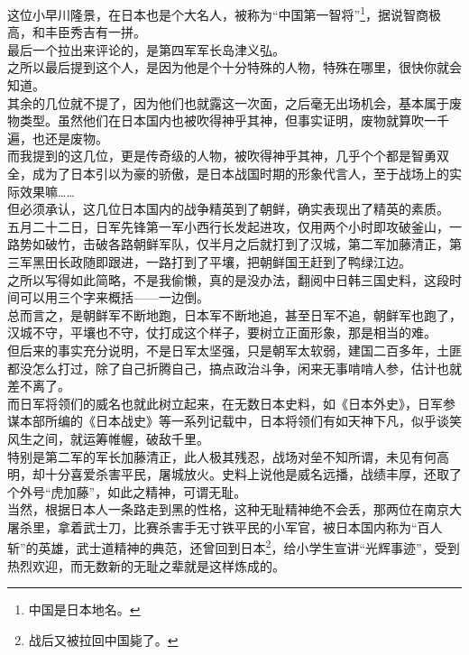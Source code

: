 \begin{multicols}{\theparacolNo}
这位小早川隆景，在日本也是个大名人，被称为“中国第一智将”\footnote{中国是日本地名。}，据说智商极高，和丰臣秀吉有一拼。\\

最后一个拉出来评论的，是第四军军长岛津义弘。\\

之所以最后提到这个人，是因为他是个十分特殊的人物，特殊在哪里，很快你就会知道。\\

其余的几位就不提了，因为他们也就露这一次面，之后毫无出场机会，基本属于废物类型。虽然他们在日本国内也被吹得神乎其神，但事实证明，废物就算吹一千遍，也还是废物。\\

而我提到的这几位，更是传奇级的人物，被吹得神乎其神，几乎个个都是智勇双全，成为了日本引以为豪的骄傲，是日本战国时期的形象代言人，至于战场上的实际效果嘛……\\

但必须承认，这几位日本国内的战争精英到了朝鲜，确实表现出了精英的素质。\\

五月二十二日，日军先锋第一军小西行长发起进攻，仅用两个小时即攻破釜山，一路势如破竹，击破各路朝鲜军队，仅半月之后就打到了汉城，第二军加藤清正，第三军黑田长政随即跟进，一路打到了平壤，把朝鲜国王赶到了鸭绿江边。\\

之所以写得如此简略，不是我偷懒，真的是没办法，翻阅中日韩三国史料，这段时间可以用三个字来概括——一边倒。\\

总而言之，是朝鲜军不断地跑，日本军不断地追，甚至日军不追，朝鲜军也跑了，汉城不守，平壤也不守，仗打成这个样子，要树立正面形象，那是相当的难。\\

但后来的事实充分说明，不是日军太坚强，只是朝军太软弱，建国二百多年，土匪都没怎么打过，除了自己折腾自己，搞点政治斗争，闲来无事啃啃人参，估计也就差不离了。\\

而日军将领们的威名也就此树立起来，在无数日本史料，如《日本外史》，日军参谋本部所编的《日本战史》等一系列记载中，日本将领们有如天神下凡，似乎谈笑风生之间，就运筹帷幄，破敌千里。\\

特别是第二军的军长加藤清正，此人极其残忍，战场对垒不知所谓，未见有何高明，却十分喜爱杀害平民，屠城放火。史料上说他是威名远播，战绩丰厚，还取了个外号“虎加藤”，如此之精神，可谓无耻。\\

当然，根据日本人一条路走到黑的性格，这种无耻精神绝不会丢，那两位在南京大屠杀里，拿着武士刀，比赛杀害手无寸铁平民的小军官，被日本国内称为“百人斩”的英雄，武士道精神的典范，还曾回到日本\footnote{战后又被拉回中国毙了。}，给小学生宣讲“光辉事迹”，受到热烈欢迎，而无数新的无耻之辈就是这样炼成的。\\


\end{multicols}
